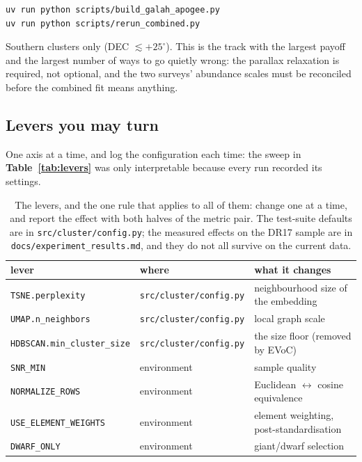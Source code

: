 \begin{verbatim}
uv run python scripts/build_galah_apogee.py
uv run python scripts/rerun_combined.py
\end{verbatim}

Southern clusters only (DEC $\lesssim +25^\circ$). This is the track with the
largest payoff and the largest number of ways to go quietly wrong: the parallax
relaxation is required, not optional, and the two surveys' abundance scales must
be reconciled before the combined fit means anything.

\subsection{Levers you may turn}

One axis at a time, and log the configuration each time: the sweep in
\textbf{Table~\ref{tab:levers}} was only interpretable because every run
recorded its settings.

\begin{table}[htbp]
\centering
\small
{}
\begin{tabular}{@{}lll@{}}
\toprule
lever & where & what it changes \\
\midrule
\texttt{TSNE.perplexity} & \texttt{src/cluster/config.py} & neighbourhood size of the embedding \\
\texttt{UMAP.n\_neighbors} & \texttt{src/cluster/config.py} & local graph scale \\
\texttt{HDBSCAN.min\_cluster\_size} & \texttt{src/cluster/config.py} & the size floor (removed by EVoC) \\
\texttt{SNR\_MIN} & environment & sample quality \\
\texttt{NORMALIZE\_ROWS} & environment & Euclidean $\leftrightarrow$ cosine equivalence \\
\texttt{USE\_ELEMENT\_WEIGHTS} & environment & element weighting, post-standardisation \\
\texttt{DWARF\_ONLY} & environment & giant/dwarf selection \\
\bottomrule
\end{tabular}
\caption{The levers, and the one rule that applies to all of them: change one
at a time, and report the effect with both halves of the metric pair. The
test-suite defaults are in \texttt{src/cluster/config.py}; the measured effects
on the DR17 sample are in \texttt{docs/experiment\_results.md}, and they do not
all survive on the current data.}
\label{tab:levers2}
\end{table}

